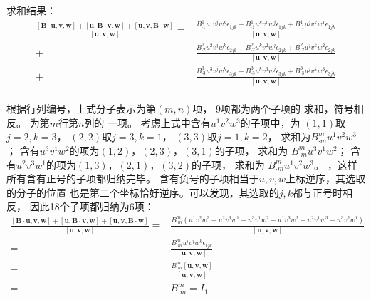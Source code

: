 \documentclass[UTF8,zihao=5]{ctexart}
\newcommand{\bm}[1]{{\mathbf{#1}}}
\begin{document}
求和结果：
\begin{equation}
    \begin{aligned}
        \frac{
        [\bm{B}\cdot\bm{u}, \bm{v}, \bm{w}]+
        [\bm{u}, \bm{B}\cdot\bm{v}, \bm{w}]+
        [\bm{u}, \bm{v}, \bm{B}\cdot\bm{w}]}{[\bm{u}, \bm{v}, \bm{w}]}
        = &
        \frac{
        B^1_{\cdot 1}u^1v^jw^k\epsilon_{1jk}+
        B^1_{\cdot 1}u^kv^1w^j\epsilon_{1jk}+
        B^1_{\cdot 1}u^jv^kw^1\epsilon_{1jk}}
        {[\bm{u}, \bm{v}, \bm{w}]} \\
        + &
        \frac{
        B^2_{\cdot 2}u^2v^jw^k\epsilon_{2jk}+
        B^2_{\cdot 2}u^kv^2w^j\epsilon_{2jk}+
        B^2_{\cdot 2}u^jv^kw^2\epsilon_{2jk}}
        {[\bm{u}, \bm{v}, \bm{w}]} \\
        + &
        \frac{
        B^3_{\cdot 3}u^3v^jw^k\epsilon_{3jk}+
        B^3_{\cdot 3}u^kv^3w^j\epsilon_{3jk}+
        B^3_{\cdot 3}u^jv^kw^3\epsilon_{3jk}}
        {[\bm{u}, \bm{v}, \bm{w}]} \\
    \end{aligned}
\end{equation}

根据行列编号，上式分子表示为第$(m,n)$项，
9项都为两个子项的
求和，符号相反。
为第$m$行第$n$列的
一项。
考虑上式中含有$u^1v^2w^3$的子项中，为
$(1,1)$取$j=2,k=3$，
$(2,2)$取$j=3,k=1$，
$(3,3)$取$j=1,k=2$，
求和为$B^m_{\cdot m}u^1v^2w^3$；
含有$u^3v^1w^2$的项为$(1,2)$，$(2,3)$，$(3,1)$的子项，
求和为
$B^m_{\cdot m}u^3v^1w^2$；
含有$u^2v^3w^1$的项为$(1,3)$，$(2,1)$，$(3,2)$的子项，
求和为
$B^m_{\cdot m}u^1v^2w^3$。
，这样所有含有正号的子项都归纳完毕。
含有负号的子项相当于$u,v,w$上标逆序，其选取的分子的位置
也是第二个坐标恰好逆序。可以发现，其选取的$j,k$都与正号时相反，
因此18个子项都归纳为6项：
\begin{equation}
    \begin{aligned}
        \frac{
        [\bm{B}\cdot\bm{u}, \bm{v}, \bm{w}]+
        [\bm{u}, \bm{B}\cdot\bm{v}, \bm{w}]+
        [\bm{u}, \bm{v}, \bm{B}\cdot\bm{w}]}{[\bm{u}, \bm{v}, \bm{w}]}
        = &
        \frac{
        B^m_{\cdot m}
        \left(
        u^1v^2w^3+u^2v^3w^1+u^3v^1w^2-
        u^1v^3w^2-u^2v^1w^3-u^3v^2w^1
        \right)}
        {[\bm{u}, \bm{v}, \bm{w}]} \\
        = &
        \frac{
        B^m_{\cdot m}
        u^iv^jw^k\epsilon_{ijk}}
        {[\bm{u}, \bm{v}, \bm{w}]} \\
        = &
        \frac{
        B^m_{\cdot m}
        [\bm{u}, \bm{v}, \bm{w}]}
        {[\bm{u}, \bm{v}, \bm{w}]} \\
        = &
        B^m_{\cdot m}=I_1
    \end{aligned}
\end{equation}
\end{document}
